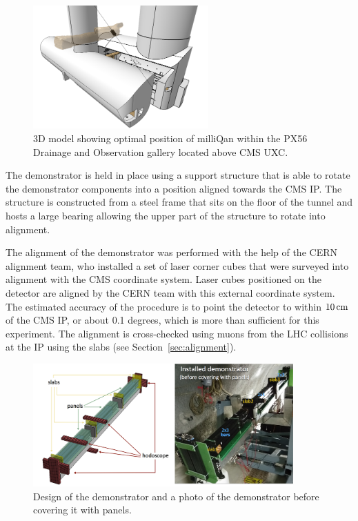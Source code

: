 \documentclass[12pt]{article}
\newcommand{\unit}[1]{\ensuremath{\text{\,#1}}\xspace}
\begin{document}
\begin{figure}
    \centering
    \includegraphics[width=0.6\textwidth]{figures/site_selection_image.png}
  \caption{3D model showing optimal position of milliQan within the PX56 Drainage and Observation gallery located above CMS UXC.\label{fig:site}}
\end{figure}

The demonstrator is held in place using a support structure 
that is able to rotate the demonstrator components into a position
aligned towards the CMS IP. The structure is constructed from a
steel frame that sits on the floor of the tunnel and hosts a 
large bearing allowing the upper part of the structure to rotate 
into alignment. 

The alignment of the demonstrator was performed with the help of the CERN alignment team, 
who installed a set of laser corner cubes that were surveyed into alignment 
with the CMS coordinate system. Laser cubes positioned on the detector are 
aligned by the CERN team with this external coordinate system. The estimated 
accuracy of the procedure is to point the detector to within $10\unit{cm}$ of 
the CMS IP, or about 0.1 degrees, which is more than sufficient for this experiment. 
The alignment is cross-checked using muons from the LHC collisions at the IP using 
the slabs (see Section~\ref{sec:alignment}).

\begin{figure}[bp!]
\centering
\includegraphics[width=0.89\textwidth]{figures/demonstratorGraphicAndPic}
\caption{Design of the demonstrator and a photo of the demonstrator before covering it with panels.}
\label{fig:demo}
\end{figure}
\end{document}
